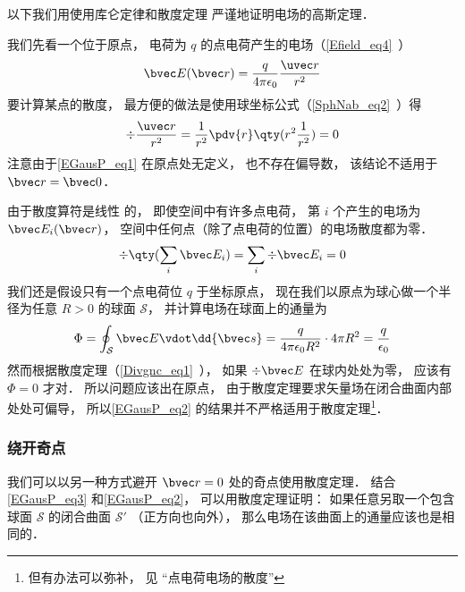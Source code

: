 

以下我们用使用库仑定律和散度定理 严谨地证明电场的高斯定理．

我们先看一个位于原点， 电荷为 $q$ 的点电荷产生的电场（\autoref{Efield_eq4}~）
\begin{equation}\label{EGausP_eq1}
\bvec E(\bvec r) = \frac{q}{4\pi\epsilon_0}\frac{\uvec r}{r^2}
\end{equation}
要计算某点的散度， 最方便的做法是使用球坐标公式（\autoref{SphNab_eq2}~）得
\begin{equation}
\div \frac{\uvec r}{r^2} = \frac{1}{r^2} \pdv{r} \qty(r^2 \frac{1}{r^2}) = 0
\end{equation}
注意由于\autoref{EGausP_eq1} 在原点处无定义， 也不存在偏导数， 该结论不适用于 $\bvec r = \bvec 0$．

由于散度算符是线性%
的， 即使空间中有许多点电荷， 第 $i$ 个产生的电场为 $\bvec E_i(\bvec r)$， 空间中任何点（除了点电荷的位置）的电场散度都为零．
\begin{equation}\label{EGausP_eq3}
\div \qty(\sum_i \bvec E_i) = \sum_i \div \bvec E_i = 0
\end{equation}
我们还是假设只有一个点电荷位 $q$ 于坐标原点， 现在我们以原点为球心做一个半径为任意 $R > 0$ 的球面 $\mathcal S$， 并计算电场在球面上的通量为
\begin{equation}\label{EGausP_eq2}
\Phi = \oint_{\mathcal S} \bvec E \vdot \dd{\bvec s} = \frac{q}{4\pi\epsilon_0 R^2} \cdot 4\pi R^2 = \frac{q}{\epsilon_0}
\end{equation}
然而根据散度定理（\autoref{Divgnc_eq1}~）， 如果 $\div \bvec E$ 在球内处处为零， 应该有 $\Phi = 0$ 才对． 所以问题应该出在原点， 由于散度定理要求矢量场在闭合曲面内部处处可偏导， %
 所以\autoref{EGausP_eq2} 的结果并不严格适用于散度定理\footnote{但有办法可以弥补， 见 “点电荷电场的散度”}． %

\subsubsection{绕开奇点}
我们可以以另一种方式避开 $\bvec r = 0$ 处的奇点使用散度定理． 结合\autoref{EGausP_eq3} 和\autoref{EGausP_eq2}， 可以用散度定理证明： 如果任意另取一个包含球面 $\mathcal S$ 的闭合曲面 $\mathcal S'$ （正方向也向外）， 那么电场在该曲面上的通量应该也是相同的．

